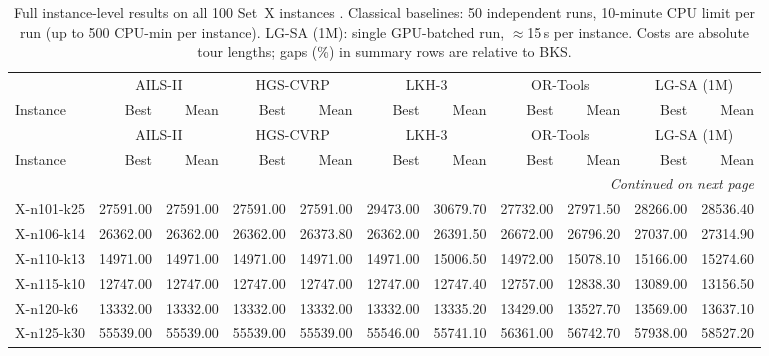 \documentclass[letterpaper]{article} %
\begin{document}
\clearpage
\onecolumn
\centering
\scriptsize
\setlength{\tabcolsep}{3pt}
\begin{longtable}{@{}l rr rr rr rr rr@{}}
\caption{Full instance-level results on all 100 Set~X instances \citep{uchoa_new_2017}. Classical baselines: 50 independent runs, 10-minute CPU limit per run (up to 500 CPU-min per instance). LG-SA (1M): single GPU-batched run, $\approx$15\,s per instance. Costs are absolute tour lengths; gaps (\%) in summary rows are relative to BKS.}
\label{tab:setx_full} \\
\toprule
& \multicolumn{2}{c}{AILS-II} & \multicolumn{2}{c}{HGS-CVRP} & \multicolumn{2}{c}{LKH-3} & \multicolumn{2}{c}{OR-Tools} & \multicolumn{2}{c}{LG-SA (1M)} \\
\cmidrule(lr){2-3}\cmidrule(lr){4-5}\cmidrule(lr){6-7}\cmidrule(lr){8-9}\cmidrule(lr){10-11}
Instance & Best & Mean & Best & Mean & Best & Mean & Best & Mean & Best & Mean \\
\midrule
\endfirsthead
\toprule
& \multicolumn{2}{c}{AILS-II} & \multicolumn{2}{c}{HGS-CVRP} & \multicolumn{2}{c}{LKH-3} & \multicolumn{2}{c}{OR-Tools} & \multicolumn{2}{c}{LG-SA (1M)} \\
\cmidrule(lr){2-3}\cmidrule(lr){4-5}\cmidrule(lr){6-7}\cmidrule(lr){8-9}\cmidrule(lr){10-11}
Instance & Best & Mean & Best & Mean & Best & Mean & Best & Mean & Best & Mean \\
\midrule
\endhead
\midrule
\multicolumn{11}{r}{\textit{Continued on next page}} \\
\midrule
\endfoot
\bottomrule
\endlastfoot
X-n101-k25 & 27591.00 & 27591.00 & 27591.00 & 27591.00 & 29473.00 & 30679.70 & 27732.00 & 27971.50 & 28266.00 & 28536.40 \\
X-n106-k14 & 26362.00 & 26362.00 & 26362.00 & 26373.80 & 26362.00 & 26391.50 & 26672.00 & 26796.20 & 27037.00 & 27314.90 \\
X-n110-k13 & 14971.00 & 14971.00 & 14971.00 & 14971.00 & 14971.00 & 15006.50 & 14972.00 & 15078.10 & 15166.00 & 15274.60 \\
X-n115-k10 & 12747.00 & 12747.00 & 12747.00 & 12747.00 & 12747.00 & 12747.40 & 12757.00 & 12838.30 & 13089.00 & 13156.50 \\
X-n120-k6 & 13332.00 & 13332.00 & 13332.00 & 13332.00 & 13332.00 & 13335.20 & 13429.00 & 13527.70 & 13569.00 & 13637.10 \\
X-n125-k30 & 55539.00 & 55539.00 & 55539.00 & 55539.00 & 55546.00 & 55741.10 & 56361.00 & 56742.70 & 57938.00 & 58527.20 \\

\end{longtable}
\end{document}
